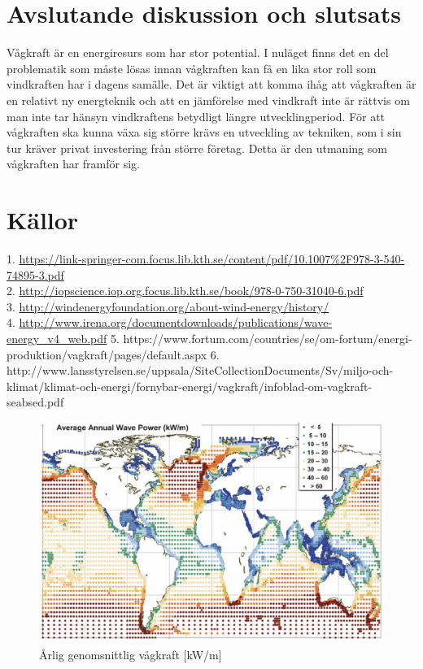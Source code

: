\documentclass[10pt,a4paper,oneside]{article}
\begin{document}
 
\section{Avslutande diskussion och slutsats}
Vågkraft är en energiresurs som har stor potential. I nuläget finns det en del problematik som måste lösas innan vågkraften kan få en lika stor roll som vindkraften har i dagens samälle. 
Det är viktigt att komma ihåg att vågkraften är en relativt ny energteknik och att en jämförelse med vindkraft inte är rättvis om man inte tar hänsyn vindkraftens betydligt längre utvecklingperiod. För att vågkraften ska kunna växa sig större krävs en utveckling av tekniken, som i sin tur kräver privat investering från större företag. Detta är den utmaning som vågkraften har framför sig. 


\section{Källor}
1. \url{https://link-springer-com.focus.lib.kth.se/content/pdf/10.1007%2F978-3-540-74895-3.pdf} \\
2. \url{http://iopscience.iop.org.focus.lib.kth.se/book/978-0-750-31040-6.pdf} \\
3. \url{http://windenergyfoundation.org/about-wind-energy/history/} \\
4. \url{http://www.irena.org/documentdownloads/publications/wave-energy_v4_web.pdf}
5. https://www.fortum.com/countries/se/om-fortum/energi-produktion/vagkraft/pages/default.aspx
6. http://www.lansstyrelsen.se/uppsala/SiteCollectionDocuments/Sv/miljo-och-klimat/klimat-och-energi/fornybar-energi/vagkraft/infoblad-om-vagkraft-seabsed.pdf




\begin{figure}
\label{Globalmean}
	\includegraphics[scale=0.6]{globalmean.png}
	\caption{\r{A}rlig genomsnittlig v\r{a}gkraft [kW/m]}
\end{figure}
\end{document}
